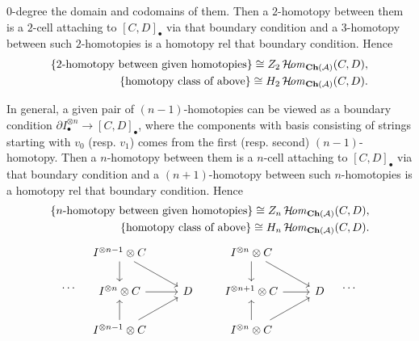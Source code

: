 {\begin{proplist}
$0$-degree the domain and codomains of them. 
Then a $2$-homotopy between them is a 
$2$-cell attaching to $[C,D]_{\bullet}$ via that boundary condition 
and a $3$-homotopy between such $2$-homotopies is 
a homotopy rel that boundary condition.
Hence 
\begin{align*}
\{\text{$2$-homotopy between given homotopies}\} \cong 
Z_2\operatorname{\mathcal{H}\!\mathit{om}}_{\mathbf{Ch}({\cal A})}(C,D),\\
\{\text{homotopy class of above}\} \cong 
H_2\operatorname{\mathcal{H}\!\mathit{om}}_{\mathbf{Ch}({\cal A})}(C,D).
\end{align*}
\item 
In general, a given pair of $(n-1)$-homotopies can be viewed as 
a boundary condition 
$\partial I^{\otimes n}_{\bullet}\to[C,D]_{\bullet}$, 
where the components with basis consisting of 
strings starting with $v_0$ (resp. $v_1$) comes from 
the first (resp. second) $(n-1)$-homotopy. 
Then a $n$-homotopy between them is a 
$n$-cell attaching to $[C,D]_{\bullet}$ via that boundary condition 
and a $(n+1)$-homotopy between such $n$-homotopies is 
a homotopy rel that boundary condition.
Hence 
\begin{align*}
\{\text{$n$-homotopy between given homotopies}\} \cong 
Z_n\operatorname{\mathcal{H}\!\mathit{om}}_{\mathbf{Ch}({\cal A})}(C,D),\\
\{\text{homotopy class of above}\} \cong 
H_n\operatorname{\mathcal{H}\!\mathit{om}}_{\mathbf{Ch}({\cal A})}(C,D).
\end{align*}
\[
\cdots
\quad
\begin{tikzcd}
I^{\otimes n-1}\otimes C\ar[d]\ar[dr]&\\
I^{\otimes n}\otimes C\ar[r]&D\\
I^{\otimes n-1}\otimes C\ar[u]\ar[ur]&
\end{tikzcd}
\qquad
\begin{tikzcd}
I^{\otimes n}\otimes C\ar[d]\ar[dr]&\\
I^{\otimes n+1}\otimes C\ar[r]&D\\
I^{\otimes n}\otimes C\ar[u]\ar[ur]&
\end{tikzcd}
\quad
\cdots
\]
\end{proplist}
}


